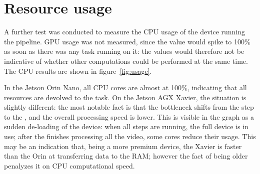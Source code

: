 \section{Resource usage}

A further test was conducted to measure the CPU usage of the device running the pipeline.
GPU usage was not measured, since the value would spike to 100\% as soon as there was any task running on it: the values would therefore not be indicative of whether other computations could be performed at the same time.
The CPU results are shown in figure~\ref{fig:usage}.

In the Jetson Orin Nano, all CPU cores are almost at 100\%, indicating that all resources are devolved to the task.
On the Jetson AGX Xavier, the situation is slightly different: the most notable fact is that the bottleneck shifts from the \locate* step to the \match*, and the overall processing speed is lower.
This is visible in the graph as a sudden de-loading of the device: when all steps are running, the full device is in use; after the \locate* finishes processing all the video, some cores reduce their usage.
This may be an indication that, being a more premium device, the Xavier is faster than the Orin at transferring data to the RAM; however the fact of being older penalyzes it on CPU computational speed.


